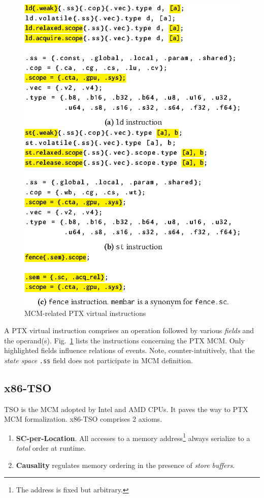 \documentclass[11pt,a4paper]{article}
\begin{document}
\begin{figure}[H]
    \centering
    \includegraphics[width=0.75\linewidth]{img/ptx.eps}
    \caption{MCM-related PTX virtual instructions}
    \label{fig:ptx-instr}
\end{figure}

A PTX virtual instruction comprises an operation followed by various \textit{fields} and the operand(s). Fig.~\ref{fig:ptx-instr} lists the instructions concerning the PTX MCM. Only highlighted fields influence relations of events. Note, counter-intuitively, that the \textit{state space} \verb|.ss| field does not participate in MCM definition.

\subsection{x86-TSO}
\label{sec:tso}

TSO is the MCM adopted by Intel and AMD CPUs. It paves the way to PTX MCM formalization. x86-TSO comprises 2 axioms.

\begin{enumerate}
    \item \textbf{SC-per-Location}. All accesses to a memory address\footnote{The address is fixed but arbitrary.} always serialize to a \textit{total} order at runtime.
    \item \textbf{Causality} regulates memory ordering in the presence of \textit{store buffers}.
\end{enumerate}
\end{document}
